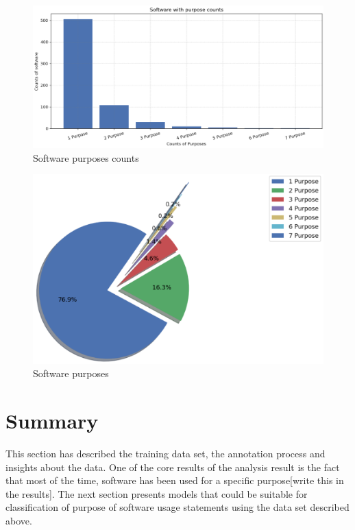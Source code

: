 \begin{figure}[htbp]
	\centering
	\includegraphics[width=1\textwidth]{4.graphics/figures/analysisresults/7.counts of software purpose}
	\caption{Software purposes counts}
	\label{fig:chapter03:setup}
\end{figure}

\begin{figure}[htbp]
	\centering
	\includegraphics[width=.65\textwidth]{4.graphics/figures/analysisresults/8.counts of software purpose pie}
	\caption{Software purposes }
	\label{fig:chapter04:pie}
\end{figure}

\section{Summary }
\label{subsec:dataset:Analysis:Summary}

This section has described the training data set, the annotation process and insights about the data. One of the core results of the analysis result is the fact that most of the time, software has been used for a specific purpose[write this in the results]. The next section presents models that could be suitable for classification of purpose of software usage statements using the data set described above. 

